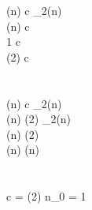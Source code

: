 \log(n) \leq c \cdot \log_2(n)
\\
\log(n) \leq c \cdot {}
\\
1 \leq c 
\\
\log(2) \leq c
\\
\\
\\
\log(n) \leq c \cdot \log_2(n)
\\
\log(n) \leq \log(2) \cdot \log_2(n)
\\
\log(n) \leq \log(2) \cdot {}
\\
\log(n) \leq \log(n)
\\
\\
\\
c = \log(2) \qquad n_0 = 1
